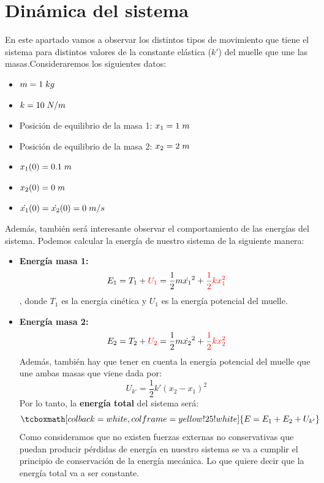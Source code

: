 \documentclass{article}
\begin{document}
\section{Dinámica del sistema}
En este apartado vamos a observar los distintos tipos de movimiento que tiene el sistema para distintos valores de la constante elástica ($k'$) del muelle que une las masas.\newline\linebreak Consideraremos los siguientes datos:
\begin{itemize}
\item $m = 1\hspace{0.1cm}kg$
\item $k = 10 \hspace{0.1cm}N/m$
\item Posición de equilibrio de la masa 1: $x_1 = 1 \hspace{0.1cm}m$
\item Posición de equilibrio de la masa 2: $x_2 = 2 \hspace{0.1cm}m$
\item $x_1 (0)= 0.1 \hspace{0.1cm}m$
\item $x_2 (0)= 0 \hspace{0.1cm}m$
\item $\dot{x_1 }(0)=\dot{x_2}(0)= 0\hspace{0.1cm}m/s$
\end{itemize}
Además, también será interesante observar el comportamiento de las energías del sistema. Podemos calcular la energía de nuestro sistema de la siguiente manera:
\begin{itemize}\renewcommand{\labelitemi}{$*$}
\item\textbf{Energía masa 1: }
$$E_1 = T_1 +  \textcolor{red}{U_1} = \frac12m\dot{x_1}^2+\textcolor{red}{\frac12kx_1^2}$$, donde $T_1$ es la energía cinética y $U_1$ es la energía potencial del muelle.
\item\textbf{Energía masa 2: }
$$E_2 = T_2 +  \textcolor{red}{U_2} = \frac12m\dot{x_2}^2+\textcolor{red}{\frac12kx_2^2}$$
Además, también hay que tener en cuenta la energía potencial del muelle que une ambas masas que viene dada por:
$$U_{k'}=\frac12k'(x_2-x_1)^2$$
Por lo tanto, la \textbf{energía total} del sistema será:
\begin{equation}\tcboxmath[colback=white,colframe=yellow!25!white]{E = E_1 + E_2 + U_{k'}}\end{equation}
Como consideramos que no existen fuerzas externas no conservativas que puedan producir pérdidas de energía en nuestro sistema se va a cumplir el principio de conservación de la energía mecánica. Lo que quiere decir que la energía total va a ser constante.\newline
\end{itemize}
\end{document}
